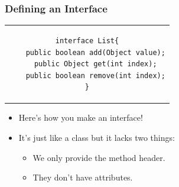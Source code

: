 \documentclass{beamer}
\begin{document}
\begin{frame}[fragile]
    \frametitle{Defining an Interface}
    \begin{center}
        \begin{tabular}{c}
            \begin{lstlisting}
interface List{
    public boolean add(Object value);
    public Object get(int index);
    public boolean remove(int index);
}
            \end{lstlisting}
        \end{tabular}
    \end{center}
    \vfill
    \begin{itemize}
        \item Here's how you make an interface!
            
        \item It's just like a class but it lacks two things:
        \begin{itemize}
            \item We only provide the method header.
            \item They don't have attributes.
        \end{itemize}
    \end{itemize}
\end{frame}
\end{document}
